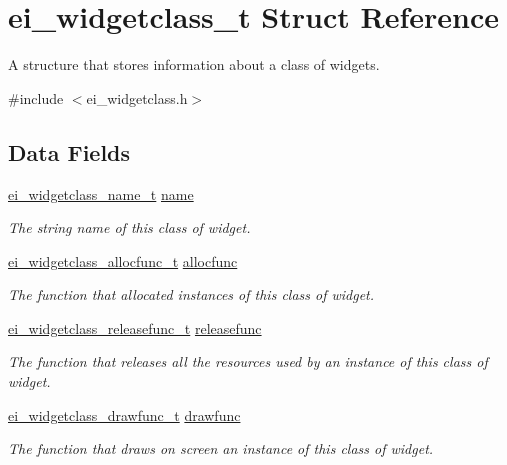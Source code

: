 \hypertarget{structei__widgetclass__t}{\section{ei\-\_\-widgetclass\-\_\-t Struct Reference}
\label{structei__widgetclass__t}
}


A structure that stores information about a class of widgets.  




{\ttfamily \#include $<$ei\-\_\-widgetclass.\-h$>$}

\subsection*{Data Fields}
\begin{DoxyCompactItemize}
\item 
\hyperlink{ei__widgetclass_8h_acfa18ebbfac8cbbc11345a01c2099aed}{ei\-\_\-widgetclass\-\_\-name\-\_\-t} \hyperlink{structei__widgetclass__t_aa5799b5999890cf04915bf0fe5151ec8}{name}
\begin{DoxyCompactList}\small\item\em The string name of this class of widget. \end{DoxyCompactList}\item 
\hyperlink{ei__widgetclass_8h_a4c7f455367004f9a620df19123cdaab8}{ei\-\_\-widgetclass\-\_\-allocfunc\-\_\-t} \hyperlink{structei__widgetclass__t_a233446250cdde4347c1381427923d21a}{allocfunc}
\begin{DoxyCompactList}\small\item\em The function that allocated instances of this class of widget. \end{DoxyCompactList}\item 
\hyperlink{ei__widgetclass_8h_ac52af60159f39628ed8ed6b1d9af5493}{ei\-\_\-widgetclass\-\_\-releasefunc\-\_\-t} \hyperlink{structei__widgetclass__t_aebe6139b31816495e866c99ec3e83de6}{releasefunc}
\begin{DoxyCompactList}\small\item\em The function that releases all the resources used by an instance of this class of widget. \end{DoxyCompactList}\item 
\hyperlink{ei__widgetclass_8h_a72107c7b4e8a6d3f91d4a02e51cb3bd3}{ei\-\_\-widgetclass\-\_\-drawfunc\-\_\-t} \hyperlink{structei__widgetclass__t_a528168099a2a1515c4cf65400ccbfff2}{drawfunc}
\begin{DoxyCompactList}\small\item\em The function that draws on screen an instance of this class of widget. \end{DoxyCompactList}\item 

\end{DoxyCompactItemize}
